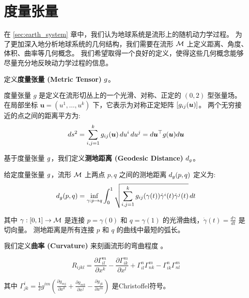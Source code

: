 \section{度量张量}
\label{sec:metric_tensor}

在 \ref{sec:earth_system} 章中，我们认为地球系统是流形上的随机动力学过程。
为了更加深入地分析地球系统的几何结构，我们需要在流形 $\mathcal{M}$ 上定义距离、角度、体积、曲率等几何概念。
我们希望取得一个良好的定义，使得这些几何概念能够尽量充分地反映动力学过程的信息。

定义\textbf{度量张量 (Metric Tensor)} $g$。

\begin{definition}[度量张量]
\label{def:metric_tensor}
    度量张量 $g$ 是定义在流形切丛上的一个光滑、对称、正定的 $(0, 2)$ 型张量场。在局部坐标 $\bm{u} = (u^1, \ldots, u^k)$ 下，它表示为对称正定矩阵 $[g_{ij}(\bm{u})]$。
    两个无穷接近的点之间的距离平方为:
    \begin{equation}
    \label{eq:metric_tensor_def}
        ds^2 = \sum_{i,j=1}^k g_{ij}(\bm{u})\,du^i\,du^j = d\bm{u}^\top g(\bm{u}) d\bm{u}
    \end{equation}
\end{definition}

基于度量张量 $g$，我们定义\textbf{测地距离 (Geodesic Distance)} $d_g$。

\begin{definition}[测地距离]
\label{def:geodesic_distance}
    给定度量张量 $g$，流形 $\mathcal{M}$ 上两点 $p, q$ 之间的测地距离 $d_g(p, q)$ 定义为:
    \begin{equation}
    \label{eq:geodesic_distance}
        d_g(p, q) = \inf_{\gamma: p \to q} \int_0^1 \sqrt{\sum_{i,j=1}^k g_{ij}(\gamma(t)) \dot{\gamma}^i(t) \dot{\gamma}^j(t)}\, dt
    \end{equation}

    其中 $\gamma: [0,1] \to \mathcal{M}$ 是连接 $p = \gamma(0)$ 和 $q = \gamma(1)$ 的光滑曲线，$\dot{\gamma}(t) = \frac{d\gamma}{dt}$ 是切向量。
    测地距离是所有连接 $p$ 和 $q$ 的曲线中最短的弧长。
\end{definition}

我们定义\textbf{曲率 (Curvature)} 来刻画流形的弯曲程度 \cite{lee2018introduction}。

\begin{definition}[Riemann曲率张量]
\label{def:riemann_curvature_tensor}
    \begin{equation}
    \label{eq:riemann_curvature_tensor}
        R_{ijkl} = \frac{\partial \Gamma_{il}^m}{\partial x^k} - \frac{\partial \Gamma_{ik}^m}{\partial x^l} + \Gamma_{il}^n\Gamma_{nk}^m - \Gamma_{ik}^n\Gamma_{nl}^m
    \end{equation}

    其中 $\Gamma_{jk}^i = \frac{1}{2}g^{im}(\frac{\partial g_{mj}}{\partial x^k} + \frac{\partial g_{mk}}{\partial x^j} - \frac{\partial g_{jk}}{\partial x^m})$ 是Christoffel符号。
\end{definition}

